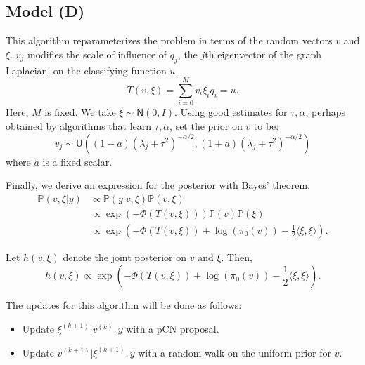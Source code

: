 \documentclass{siamart1116}
\begin{document}
    \subsection{Model (D)}
        This algorithm reparameterizes the problem in terms of the random vectors $v$ and $\xi$. $v_j$ modifies the scale of influence of $q_j$, the $j$th eigenvector of the graph Laplacian, on the classifying function $u$.
        \begin{equation}
        \label{eqn:v_T}
        T(v,\xi) = \sum_{i=0}^{M} v_i\xi_iq_i = u.
        \end{equation}
        Here, $M$ is fixed. We take $\xi \sim \mathsf{N}(0, I)$. Using good estimates for $\tau, \alpha$, perhaps obtained by algorithms that learn $\tau, \alpha$, set the prior on $v$ to be:
        \[v_j \sim \mathsf{U}\left((1-a)(\lambda_j+\tau^2)^{-\alpha/2},(1+a)(\lambda_j+\tau^2)^{-\alpha/2}\right)\]
        where $a$ is a fixed scalar.

        Finally, we derive an expression for the posterior with Bayes' theorem.
        \begin{align*}
        \mathbb{P}(v,\xi | y) &\propto \mathbb{P}(y|v, \xi) \mathbb{P}(v, \xi)\\
        &\propto \exp \left(-\Phi(T(v,\xi)) \right) \mathbb{P}(v)\mathbb{P}(\xi) \\
        &\propto \exp \left(-\Phi(T(v,\xi)) + \log (\pi_0(v)) - \frac{1}{2}\langle \xi, \xi \rangle  \right).
        \end{align*}

        Let $h(v,\xi)$ denote the joint posterior on $v$ and $\xi$. Then,
        \begin{equation}
        \label{eqn:learn_v_posterior}
        h(v, \xi) \propto \exp \left(-\Phi(T(v,\xi)) + \log (\pi_0(v)) - \frac{1}{2}\langle \xi, \xi \rangle  \right).
        \end{equation}

        The updates for this algorithm will be done as follows:

        \begin{itemize}
            \item Update $\xi^{(k+1)} | v^{(k)}, y$ with a pCN proposal.
            \item Update $v^{(k+1)} | \xi^{(k+1)}, y$ with a random walk on the uniform prior for $v$.
        \end{itemize}
\end{document}
